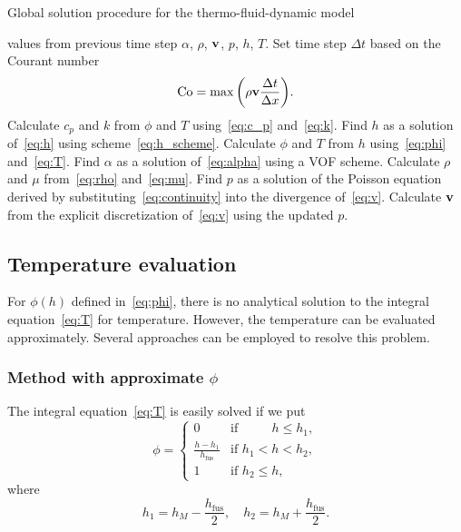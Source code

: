 \documentclass{article}
\newcommand{\fusion}[1]{{#1}_\mathrm{fus}}
\newcommand{\bv}{\vb{v}}
\begin{document}
\begin{algorithm}[H]
\caption{Global solution procedure for the thermo-fluid-dynamic model}\label{alg:tfd}
\begin{algorithmic}[1]
    \Require values from previous time step $\alpha$, $\rho$, $\bv$, $p$, $h$, $T$.
    \State Set time step $\Delta{t}$ based on the Courant number
    \begin{equation}\label{eq:Courant}
        \mathrm{Co} = \max\qty( \rho\bv\frac{\Delta t}{\Delta x} ).
    \end{equation}
    \State Calculate $c_p$ and $k$ from $\phi$ and $T$ using~\eqref{eq:c_p} and~\eqref{eq:k}.
    \State Find $h$ as a solution of~\eqref{eq:h} using scheme~\eqref{eq:h_scheme}.
    \State Calculate $\phi$ and $T$ from $h$ using~\eqref{eq:phi} and~\eqref{eq:T}.
        \State Find $\alpha$ as a solution of~\eqref{eq:alpha} using a VOF scheme.
        \State Calculate $\rho$ and $\mu$ from~\eqref{eq:rho} and~\eqref{eq:mu}.
            \State Find $p$ as a solution of the Poisson equation derived by substituting~\eqref{eq:continuity}
            into the divergence of~\eqref{eq:v}.
            \State Calculate $\bv$ from the explicit discretization of~\eqref{eq:v} using the updated $p$.
        \EndWhile
    \EndWhile
\end{algorithmic}
\end{algorithm}

\subsection{Temperature evaluation}

For $\phi(h)$ defined in~\eqref{eq:phi}, there is no analytical solution to the integral equation~\eqref{eq:T} for temperature.
However, the temperature can be evaluated approximately.
Several approaches can be employed to resolve this problem.

\subsubsection{Method with approximate $\phi$}

The integral equation~\eqref{eq:T} is easily solved if we put
\begin{equation}\label{eq:phi-piecewise}
    \phi = \begin{cases}
        0                        &\text{if }\qquad\,\, h \leq h_1, \\
        \frac{h-h_1}{\fusion{h}} &\text{if } h_1 < h < h_2, \\
        1                        &\text{if } h_2 \leq h,
    \end{cases}
\end{equation}
where
\begin{equation}\label{eq:enthalpySL}
    h_1 = h_M - \frac{\fusion{h}}2, \quad h_2 = h_M + \frac{\fusion{h}}2.
\end{equation}
\end{document}
